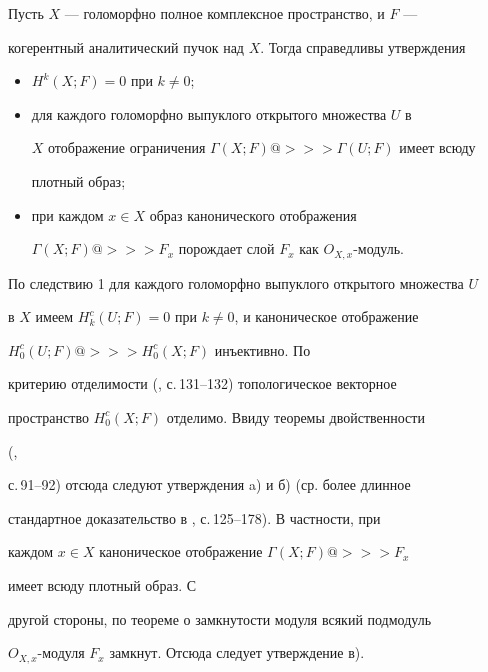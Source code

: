 \begin{cor} 


Пусть $X$ --- голоморфно полное комплексное пространство, и $F$ --- 


когерентный аналитический пучок над $X$. Тогда справедливы утверждения 


\begin{itemize} 


\item[a)] $H^k(X;F)=0$ при $k\ne 0$; 


\item[б)] для каждого голоморфно выпуклого открытого множества $U$ в 


$X$ отображение ограничения $\Gamma(X;F)@>>>\Gamma(U;F)$ имеет всюду 


плотный образ; 


\item[в)] при каждом $x\in X$ образ канонического отображения 


$\Gamma(X;F)@>>>F_x$ порождает слой $F_x$ как $O_{X,x}$-модуль. 


\end{itemize} 


\end{cor} 


 


\begin{pf} 


По следствию 1 для каждого голоморфно выпуклого открытого множества $U$ 


в $X$ имеем $H^c_k(U;F)=0$ при $k\ne 0$, и каноническое отображение 


$H^c_0(U;F)@>>>H^c_0(X;F)$ инъективно. По 


критерию отделимости (\cite{1}, с.\,131--132) топологическое векторное 


пространство $H^c_0(X;F)$ отделимо. Ввиду теоремы двойственности 


(\cite{1}, 


с.\,91--92) отсюда следуют утверждения a) и б) (ср. более длинное 


стандартное доказательство в \cite{7}, с.\,125--178). В частности, при 


каждом $x\in X$ каноническое отображение $\Gamma(X;F)@>>>F_x$ 


имеет всюду плотный образ. С 


другой стороны, по теореме о замкнутости модуля всякий подмодуль 


$O_{X,x}$-модуля $F_x$ замкнут. Отсюда следует утверждение в). 


\end{pf} 



